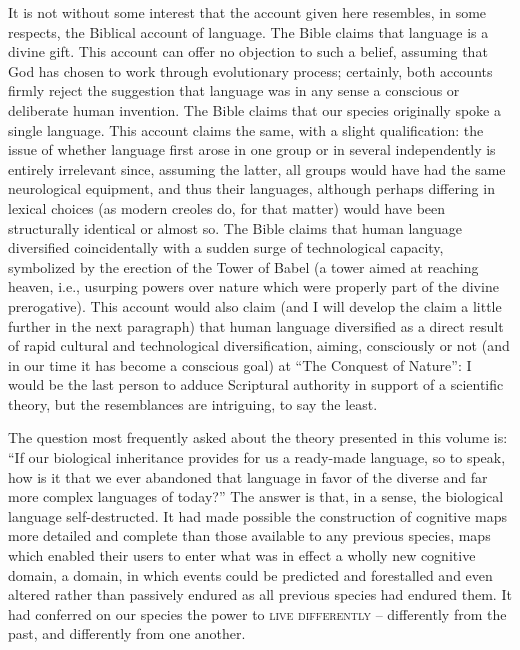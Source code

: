 It is not without some interest that the account given here resembles, in some respects, the Biblical account of language. The Bible claims that language is a divine gift. This account can offer no objection to such a belief, assuming that God has chosen to work through evolutionary process; certainly, both accounts firmly reject the suggestion that language was in any sense a conscious or deliberate human invention. The Bible claims that our species originally spoke a single language. This account claims the same, with a slight qualification: the issue of whether language first arose in one group or in several independently is entirely irrelevant since, assuming the latter, all groups would have had the same neurological equipment, and thus their languages, although perhaps differing in lexical choices (as modern creoles do, for that matter) would have been structurally identical or almost so. The Bible claims that human language diversified coincidentally with a sudden surge of technological capacity, symbolized
by the erection of the Tower of Babel (a tower aimed at reaching heaven, i.e., usurping powers over nature which were properly part of the divine prerogative). This account would also claim (and I will develop the claim a little further in the next paragraph) that human language diversified as a direct result of rapid cultural and technological diversification, aiming, consciously or not (and in our time it has become a conscious goal) at ``The Conquest of Nature'': I would be the last person to adduce Scriptural authority in support of a scientific theory, but the resemblances are intriguing, to say the least.

The question most frequently asked about the theory presented in this volume is: ``If our biological inheritance provides for us a ready-made language, so to speak, how is it that we ever abandoned that language in favor of the diverse and far more complex languages of today?'' The answer is that, in a sense, the biological language self-destructed. It had made possible the construction of cognitive maps more detailed and complete than those available to any previous species, maps which enabled their users to enter what was in effect a wholly new cognitive domain, a domain, in which events could be predicted and forestalled and even altered rather than passively endured as all previous species had endured them. It had conferred on our species the power to \textsc{live differently} -- differently from the past, and differently from one another.

